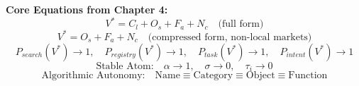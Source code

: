 \documentclass[12pt, openany]{book}
\theoremstyle{thmstyle}
\theoremstyle{defstyle}
\newcommand{\vstar}{V^{*}}
\newcommand{\Nc}{N_c}
\newcommand{\Os}{O_s}
\newcommand{\Fa}{F_a}
\newcommand{\Cl}{C_l}
\begin{document}
\begin{equationbox}
\textbf{Core Equations from Chapter 4:}
\[
\vstar = \Cl + \Os + \Fa + \Nc \quad \text{(full form)}
\]
\[
\vstar = \Os + \Fa + \Nc \quad \text{(compressed form, non-local markets)}
\]
\[
P_{search}(\vstar) \to 1, \quad P_{registry}(\vstar) \to 1, \quad P_{task}(\vstar) \to 1, \quad P_{intent}(\vstar) \to 1
\]
\[
\text{Stable Atom:} \quad \alpha \to 1, \quad \sigma \to 0, \quad \tau_i \to 0
\]
\[
\text{Algorithmic Autonomy:} \quad \text{Name} \equiv \text{Category} \equiv \text{Object} \equiv \text{Function}
\]
\end{equationbox}
\end{document}
